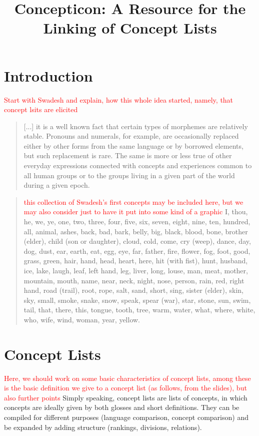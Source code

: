 \documentclass[10pt, a4paper]{article}
\title{Concepticon: A Resource for the Linking of Concept Lists}
\begin{document}
\maketitleabstract

\section{Introduction}
\textcolor{red}{Start with Swadesh and explain, how this whole idea started, namely, that concept
lsits are elicited}
\begin{quote}
[...] it is a well known fact that certain types of morphemes are relatively stable. Pronouns and
numerals, for example, are occasionally replaced either by other forms from the same language or by
borrowed elements, but such replacement is rare. The same is more or less true of other everyday
expressions connected with concepts and experiences common to all human groups or to the groups
living in a given part of the world during a given epoch. \cite[pagepending]{Swadesh1950}
\end{quote}


\begin{quote}
  \textcolor{red}{this collection of Swadesh's first concepts may be included here, but we may also
  consider just to have it put into some kind of a graphic}
  I, thou, he, we, ye, one, two, three, four, five,
six, seven, eight, nine, ten, hundred, all,
animal, ashes, back, bad, bark, belly, big,
black, blood, bone, brother (elder), child
(son or daughter), cloud, cold, come, cry
(weep), dance, day, dog, dust, ear, earth, eat,
egg, eye, far, father, fire, flower, fog, foot,
good, grass, green, hair, hand, head, heart,
here, hit (with fist), hunt, husband, ice,
lake, laugh, leaf, left hand, leg, liver, long,
louse, man, meat, mother, mountain, mouth,
name, near, neck, night, nose, person, rain,
red, right hand, road (trail), root, rope, salt,
sand, short, sing, sister (elder), skin, sky,
small, smoke, snake, snow, speak, spear
(war), star, stone, sun, swim, tail, that, there,
this, tongue, tooth, tree, warm, water, what,
where, white, who, wife, wind, woman, year,
yellow. \cite[161]{Swadesh1950}
\end{quote}

\section{Concept Lists}
\textcolor{red}{Here, we should work on some basic characteristics of concept lists, among these is
the basic definition we give to a concept list (as follows, from the slides), but also further
points}
Simply speaking, concept lists are lists of concepts, in which
concepts are ideally given by both glosses and short definitions. 
They can be compiled for different purposes (language
comparison, concept comparison) and be expanded by adding structure (rankings, divisions, relations).
\end{document}
